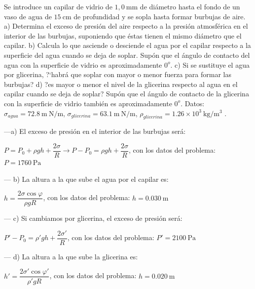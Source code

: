 \begin{prob}
\small{Se introduce un capilar de vidrio de $1,0 \ \mathrm{mm}$ de diámetro hasta el fondo de un vaso de agua de $15 \ \mathrm{cm}$ de profundidad y se sopla hasta formar burbujas de aire. a) Determina el exceso de presión del aire respecto a la presión atmosférica en el interior de las burbujas, suponiendo que éstas tienen el mismo diámetro que el capilar. b) Calcula lo que asciende o desciende el agua por el capilar respecto a la superficie del agua cuando se deja de soplar. Supón que el ángulo de contacto del agua con la superficie de vidrio es aproximadamente $0^o$. c) Si se sustituye el agua por glicerina, ?`habrá que soplar con mayor o menor fuerza para formar las burbujas? d) ?es mayor o menor el nivel de la glicerina respecto al agua en el capilar cuando se deja de soplar? Supón que el ángulo de contacto de la glicerina con la superficie de vidrio también es aproximadamente $0^o$. Datos: $\sigma_{agua}=72.8 \ \mathrm{m\ N/m}$, $\sigma_{glicerina}=63.1 \ \mathrm{m\ N/m}$, $\rho_{glicerina}=1.26  \times 10^3 \ \mathrm{kg}/\mathrm{m}^3$	}\normalsize{.}
\end{prob}


---a) El exceso de presión en el interior de las burbujas será:

$P=P_0+\rho g h + \dfrac {2\sigma}{R} \to P-P_0=\rho g h + \dfrac {2\sigma}{R}$, con los datos del problema: $P=1760\ \mathrm{Pa}$

--- b) La altura a la que sube el agua por el capilar es:

$h=\dfrac{2\sigma \cos \varphi}{\rho g R}$, con los datos del problema: $h=0.030 \ \mathrm{m}$

--- c) Si cambiamos por glicerina, el exceso de presión será:

$ P'-P_0=\rho' g h + \dfrac {2\sigma'}{R}$, con los datos del problema: $P'=2100\ \mathrm{Pa}$

--- d) La altura a la que sube la glicerina es:

$h'=\dfrac{2\sigma' \cos \varphi'}{\rho' g R}$, con los datos del problema: $h=0.020\  \mathrm{m}$


